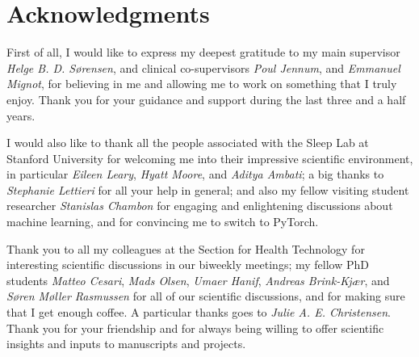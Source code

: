 



\bigskip

\begingroup
\let\clearpage\relax
\let\cleardoublepage\relax
\let\cleardoublepage\relax
\chapter*{Acknowledgments}
\vfill

First of all, I would like to express my deepest gratitude to my main supervisor \emph{Helge B. D. Sørensen}, and clinical co-supervisors \emph{Poul Jennum}, and \emph{Emmanuel Mignot}, for believing in me and allowing me to work on something that I truly enjoy. 
Thank you for your guidance and support during the last three and a half years.

I would also like to thank all the people associated with the Sleep Lab at Stanford University for welcoming me into their impressive scientific environment, in particular \emph{Eileen Leary}, \emph{Hyatt Moore}, and \emph{Aditya Ambati}; a big thanks to \emph{Stephanie Lettieri} for all your help in general; and also my fellow visiting student researcher \emph{Stanislas Chambon} for engaging and enlightening discussions about machine learning, and for convincing me to switch to PyTorch.

Thank you to all my colleagues at the Section for Health Technology for interesting scientific discussions in our biweekly meetings; my fellow PhD students \emph{Matteo Cesari}, \emph{Mads Olsen}, \emph{Umaer Hanif}, \emph{Andreas Brink-Kjær}, and \emph{Søren Møller Rasmussen} for all of our scientific discussions, and for making sure that I get enough coffee.
A particular thanks goes to \emph{Julie A. E. Christensen}.
Thank you for your friendship and for always being willing to offer scientific insights and inputs to manuscripts and projects.

